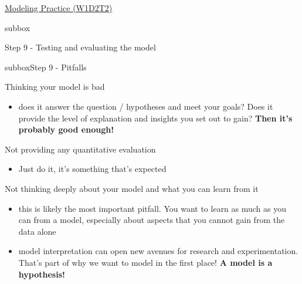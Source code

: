 \begin{textbox}{\href{https://compneuro.neuromatch.io/tutorials/W1D2_ModelingPractice/W1D2_Intro.html}{Modeling Practice  (W1D2T2)} }
\begin{subbox}{subbox}{Step 9 - Testing and evaluating the model

}
 \end{subbox}
\begin{subbox}{subbox}{Step 9 - Pitfalls }
\scriptsize

Thinking your model is bad
\begin{itemize}
    \item does it answer the question / hypotheses and meet your goals? Does it provide the level of explanation and insights you set out to gain? \textbf{Then it's probably good enough!} \end{itemize}

Not providing any quantitative evaluation
\begin{itemize}
    \item Just do it, it's something that's expected\end{itemize}

Not thinking deeply about your model and what you can learn from it
\begin{itemize}
    \item this is likely the most important pitfall. You want to learn as much as you can from a model, especially about aspects that you cannot gain from the data alone
    \item model interpretation can open new avenues for research and experimentation. That's part of why we want to model in the first place! \textbf{A model is a hypothesis!}\end{itemize}

\end{subbox}
 
 
\end{textbox}

